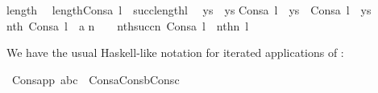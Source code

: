 \begin{isabelle}%
length{\isacharparenleft}{\kern0pt}{\isacharbrackleft}{\kern0pt}{\isacharbrackright}{\kern0pt}{\isacharparenright}{\kern0pt}\ {\isacharequal}{\kern0pt}\ {}\isasep\isanewline%
length{\isacharparenleft}{\kern0pt}Cons{\isacharparenleft}{\kern0pt}a{\isacharcomma}{\kern0pt}\ l{\isacharparenright}{\kern0pt}{\isacharparenright}{\kern0pt}\ {\isacharequal}{\kern0pt}\ succ{\isacharparenleft}{\kern0pt}length{\isacharparenleft}{\kern0pt}l{\isacharparenright}{\kern0pt}{\isacharparenright}{\kern0pt}\isasep\isanewline%
{\isacharbrackleft}{\kern0pt}{\isacharbrackright}{\kern0pt}\ {\isacharat}{\kern0pt}\ ys\ {\isacharequal}{\kern0pt}\ ys\isasep\isanewline%
Cons{\isacharparenleft}{\kern0pt}a{\isacharcomma}{\kern0pt}\ l{\isacharparenright}{\kern0pt}\ {\isacharat}{\kern0pt}\ ys\ {\isacharequal}{\kern0pt}\ Cons{\isacharparenleft}{\kern0pt}a{\isacharcomma}{\kern0pt}\ l\ {\isacharat}{\kern0pt}\ ys{\isacharparenright}{\kern0pt}\isasep\isanewline%
nth{\isacharparenleft}{\kern0pt}{}{\isacharcomma}{\kern0pt}\ Cons{\isacharparenleft}{\kern0pt}a{\isacharcomma}{\kern0pt}\ l{\isacharparenright}{\kern0pt}{\isacharparenright}{\kern0pt}\ {\isacharequal}{\kern0pt}\ a\isasep\isanewline%
n\ {\isasymin}\ {\isasymomega}\ {\isasymLongrightarrow}\ nth{\isacharparenleft}{\kern0pt}succ{\isacharparenleft}{\kern0pt}n{\isacharparenright}{\kern0pt}{\isacharcomma}{\kern0pt}\ Cons{\isacharparenleft}{\kern0pt}a{\isacharcomma}{\kern0pt}\ l{\isacharparenright}{\kern0pt}{\isacharparenright}{\kern0pt}\ {\isacharequal}{\kern0pt}\ nth{\isacharparenleft}{\kern0pt}n{\isacharcomma}{\kern0pt}\ l{\isacharparenright}{\kern0pt}%
\end{isabelle}%
We have the usual Haskell-like notation for iterated applications
of :%
\begin{isabelle}
\isamarkupfalse%
\ Cons{\isacharunderscore}{\kern0pt}app{\isacharcolon}{\kern0pt}\ {\isachardoublequoteopen}{\isacharbrackleft}{\kern0pt}a{\isacharcomma}{\kern0pt}b{\isacharcomma}{\kern0pt}c{\isacharbrackright}{\kern0pt}\ {\isacharequal}{\kern0pt}\ Cons{\isacharparenleft}{\kern0pt}a{\isacharcomma}{\kern0pt}Cons{\isacharparenleft}{\kern0pt}b{\isacharcomma}{\kern0pt}Cons{\isacharparenleft}{\kern0pt}c{\isacharcomma}{\kern0pt}{\isacharbrackleft}{\kern0pt}{\isacharbrackright}{\kern0pt}{\isacharparenright}{\kern0pt}{\isacharparenright}{\kern0pt}{\isacharparenright}{\kern0pt}{\isachardoublequoteclose}%
\end{isabelle}

